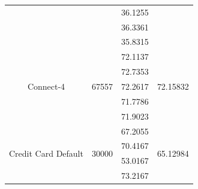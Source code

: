 \documentclass[12pt]{article}
\begin{document}
\begin{table}[]
\begin{tabular}{|c|c|c|c|}
		&                         & 36.1255                                                                                          &                             \\ \cline{3-3}
		&                         & 36.3361                                                                                          &                             \\ \cline{3-3}
		&                         & 35.8315                                                                                          &                             \\ \hline
		\multirow{5}{*}{Connect-4}           & \multirow{5}{*}{67557}  & 72.1137                                                                                          & \multirow{5}{*}{72.15832}   \\ \cline{3-3}
		&                         & 72.7353                                                                                          &                             \\ \cline{3-3}
		&                         & 72.2617                                                                                          &                             \\ \cline{3-3}
		&                         & 71.7786                                                                                          &                             \\ \cline{3-3}
		&                         & 71.9023                                                                                          &                             \\ \hline
		\multirow{5}{*}{Credit Card Default} & \multirow{5}{*}{30000}  & 67.2055                                                                                          & \multirow{5}{*}{65.12984}   \\ \cline{3-3}
		&                         & 70.4167                                                                                          &                             \\ \cline{3-3}
		&                         & 53.0167                                                                                          &                             \\ \cline{3-3}
		&                         & 73.2167                                                                                          &                             \\ \cline{3-3}

\end{tabular}
\end{table}
\end{document}
